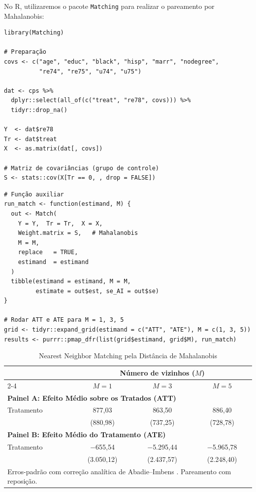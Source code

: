 \documentclass[12pt,a4paper]{article}
\begin{document}
No R, utilizaremos o pacote \texttt{Matching} para realizar o pareamento por Mahalanobis:

\begin{lstlisting}[style=Rstyle]
library(Matching)

# Preparação
covs <- c("age", "educ", "black", "hisp", "marr", "nodegree",
          "re74", "re75", "u74", "u75")

dat <- cps %>%
  dplyr::select(all_of(c("treat", "re78", covs))) %>%
  tidyr::drop_na()

Y  <- dat$re78
Tr <- dat$treat
X  <- as.matrix(dat[, covs])

# Matriz de covariâncias (grupo de controle)
S <- stats::cov(X[Tr == 0, , drop = FALSE])
\end{lstlisting}

\begin{lstlisting}[style=Rstyle]
# Função auxiliar
run_match <- function(estimand, M) {
  out <- Match(
    Y = Y,  Tr = Tr,  X = X,
    Weight.matrix = S,   # Mahalanobis
    M = M,
    replace   = TRUE,
    estimand  = estimand
  )
  tibble(estimand = estimand, M = M,
         estimate = out$est, se_AI = out$se)
}

# Rodar ATT e ATE para M = 1, 3, 5
grid <- tidyr::expand_grid(estimand = c("ATT", "ATE"), M = c(1, 3, 5))
results <- purrr::pmap_dfr(list(grid$estimand, grid$M), run_match)
\end{lstlisting}

\begin{table}[H]
\centering
\caption{Nearest Neighbor Matching pela Distância de Mahalanobis}\label{tab:mahalanobis}
\begin{tabular}{lccc}
\toprule
 & \multicolumn{3}{c}{Número de vizinhos ($M$)} \\
\cmidrule(lr){2-4}
 & $M=1$ & $M=3$ & $M=5$ \\
\midrule
\multicolumn{4}{l}{\textbf{Painel A: Efeito Médio sobre os Tratados (ATT)}} \\
\midrule
Tratamento & 877{,}03 & 863{,}50 & 886{,}40 \\
           & (880{,}98) & (737{,}25) & (728{,}78) \\
\midrule
\multicolumn{4}{l}{\textbf{Painel B: Efeito Médio do Tratamento (ATE)}} \\
\midrule
Tratamento & $-$655{,}54 & $-$5.295{,}44 & $-$5.965{,}78 \\
           & (3.050{,}12) & (2.437{,}57) & (2.248{,}40) \\
\bottomrule
\multicolumn{4}{l}{\footnotesize Erros-padrão com correção analítica de Abadie--Imbens \citep{abadie2006large}. Pareamento com reposição.}\\
\end{tabular}
\end{table}
\end{document}
